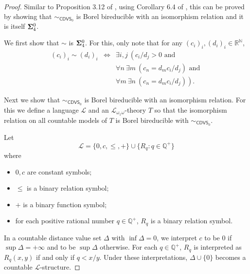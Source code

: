 \documentclass{amsart}
\theoremstyle{definition}
\theoremstyle{remark}
\begin{document}
\begin{proof}
    Similar to Proposition 3.12 of \cite{CMMRS}, using Corollary 6.4 of \cite{HKL}, this can be proved by showing that $\sim_{\mathsf{CDVS}_0}$ is Borel bireducible with an isomorphism relation and it is itself ${\bf\Sigma}^0_4$. 

We first show that $\sim$ is ${\bf\Sigma}^0_4$. For this, only note that for any $(c_i)_i, (d_i)_i\in \mathbb{R}^{\mathbb{N}}$, 
$$\begin{array}{rcl}
(c_i)_i\sim (d_i)_i&\iff& \exists i,j\ \left( c_i/d_j>0 \mbox{ and }\right. \\
& &  \forall n\ \exists m\ \left( c_n=d_mc_i/d_j \right) \mbox{ and }  \\
& &\left.\forall m\ \exists n\ \left( c_n=d_mc_i/d_j \right) \right). 
\end{array}$$

Next we show that $\sim_{\mathsf{CDVS}_0}$ is Borel bireducible with an isomorphism relation. For this we define a language $\mathcal{L}$ and an $\mathcal{L}_{\omega_1 \omega}$-theory $T$ so that the isomorphism relation on all countable models of $T$ is Borel bireducible with $\sim_{\mathsf{CDVS}_0}$.

    Let 
$$\mathcal{L}=\{0, c, \leq, +\}\cup\{R_q\colon q\in \mathbb{Q}^+\}$$
where 
\begin{itemize}
\item $0,c$ are constant symbols; 
\item $\leq$ is a binary relation symbol;
\item $+$ is a binary function symbol;
\item for each positive rational number $q\in \mathbb{Q}^+$, $R_q$ is a binary relation symbol.
\end{itemize}

In a countable distance value set $\Delta$ with $\inf\Delta=0$, we interpret $c$ to be $0$ if $\sup\Delta=+\infty$ and to be $\sup\Delta$ otherwise. For each $q\in \mathbb{Q}^+$, $R_q$ is interpreted as $R_q(x,y)$ if and only if $q<x/y$. Under these interpretations, $\Delta\cup\{0\}$ becomes a countable $\mathcal{L}$-structure.


\end{proof}
\end{document}
